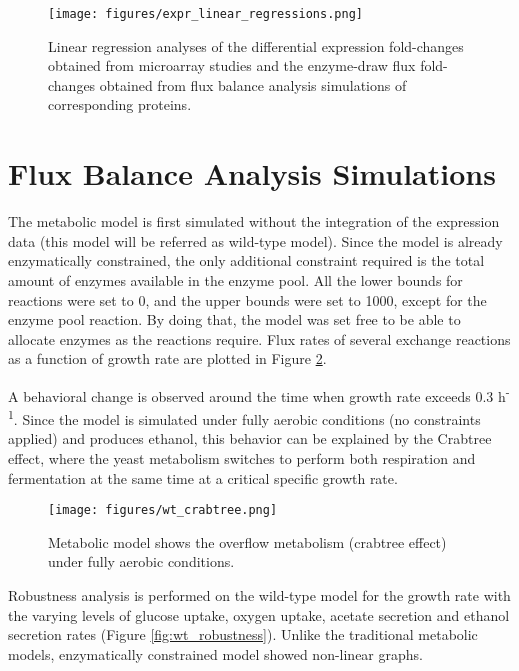 \begin{figure}[H]
  \begin{center}
  \texttt{[image: figures/expr\_linear\_regressions.png]}
  \caption[Linear regression analyses of the fold-changes]{Linear regression analyses of the differential expression fold-changes obtained from microarray studies and the enzyme-draw flux fold-changes obtained from flux balance analysis simulations of corresponding proteins.}
  \label{fig:expr_linear_regressions}
  \end{center}
\end{figure}

\section{Flux Balance Analysis Simulations}

The metabolic model is first simulated without the integration of the expression data (this model will be referred as wild-type model). Since the model is already enzymatically constrained, the only additional constraint required is the total amount of enzymes available in the enzyme pool. All the lower bounds for reactions were set to 0, and the upper bounds were set to 1000, except for the enzyme pool reaction. By doing that, the model was set free to be able to allocate enzymes as the reactions require. Flux rates of several exchange reactions as a function of growth rate are plotted in Figure \ref{fig:wt_crabtree}.

A behavioral change is observed around the time when growth rate exceeds 0.3 h\textsuperscript{-1}. Since the model is simulated under fully aerobic conditions (no constraints applied) and produces ethanol, this behavior can be explained by the Crabtree effect, where the yeast metabolism switches to perform both respiration and fermentation at the same time at a critical specific growth rate.

\begin{figure}[H]
  \begin{center}
  \texttt{[image: figures/wt\_crabtree.png]}
  \caption[Metabolic model shows the overflow metabolism]{Metabolic model shows the overflow metabolism (crabtree effect) under fully aerobic conditions.}
  \label{fig:wt_crabtree}
  \end{center}
\end{figure}

Robustness analysis is performed on the wild-type model for the growth rate with the varying levels of glucose uptake, oxygen uptake, acetate secretion and ethanol secretion rates (Figure \ref{fig:wt_robustness}). Unlike the traditional metabolic models, enzymatically constrained model showed non-linear graphs.

